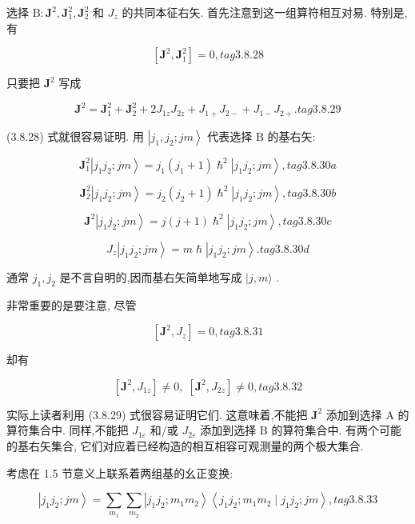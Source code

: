 选择 $\mathrm{B} : {\mathbf{J}}^{2},{\mathbf{J}}_{1}^{2},{\mathbf{J}}_{2}^{2}$ 和 ${J}_{z}$ 的共同本征右矢. 首先注意到这一组算符相互对易. 特别是, 有

$$
\left\lbrack {{\mathbf{J}}^{2},{\mathbf{J}}_{1}^{2}}\right\rbrack = 0, tag{3.8.28}
$$

只要把 ${\mathbf{J}}^{2}$ 写成

$$
{\mathbf{J}}^{2} = {\mathbf{J}}_{1}^{2} + {\mathbf{J}}_{2}^{2} + 2{J}_{1z}{J}_{2z} + {J}_{1 + }{J}_{2 - } + {J}_{1 - }{J}_{2 + }. tag{3.8.29}
$$

(3.8.28) 式就很容易证明. 用 $\left| {{j}_{1},{j}_{2};{jm}}\right\rangle$ 代表选择 $\mathrm{B}$ 的基右矢:

$$
{\mathbf{J}}_{1}^{2}\left| {{j}_{1}{j}_{2};{jm}}\right\rangle = {j}_{1}\left( {{j}_{1} + 1}\right) {\hslash }^{2}\left| {{j}_{1}{j}_{2};{jm}}\right\rangle , tag{3.8.30a}
$$

$$
{\mathbf{J}}_{2}^{2}\left| {{j}_{1}{j}_{2};{jm}}\right\rangle = {j}_{2}\left( {{j}_{2} + 1}\right) {\hslash }^{2}\left| {{j}_{1}{j}_{2};{jm}}\right\rangle , tag{3. 8. 30b}
$$

$$
{\mathbf{J}}^{2}\left| {{j}_{1}{j}_{2};{jm}}\right\rangle = j\left( {j + 1}\right) {\hslash }^{2}\left| {{j}_{1}{j}_{2};{jm}}\right\rangle , tag{3.8.30c}
$$

$$
{J}_{z}\left| {{j}_{1}{j}_{2};{jm}}\right\rangle = m\hslash \left| {{j}_{1}{j}_{2};{jm}}\right\rangle . tag{3.8.30d}
$$

通常 ${j}_{1},{j}_{2}$ 是不言自明的,因而基右矢简单地写成 $|j, m\rangle$ .

非常重要的是要注意, 尽管

$$
\left\lbrack {{\mathbf{J}}^{2},{J}_{z}}\right\rbrack = 0, tag{3.8.31}
$$

却有

$$
\left\lbrack {{\mathbf{J}}^{2},{J}_{1z}}\right\rbrack \neq 0,\;\left\lbrack {{\mathbf{J}}^{2},{J}_{2z}}\right\rbrack \neq 0, tag{3.8.32}
$$

实际上读者利用 (3.8.29) 式很容易证明它们. 这意味着,不能把 ${\mathbf{J}}^{2}$ 添加到选择 $\mathrm{A}$ 的算符集合中. 同样,不能把 ${J}_{1\varepsilon }$ 和/或 ${J}_{2\varepsilon }$ 添加到选择 $\mathrm{B}$ 的算符集合中. 有两个可能的基右矢集合, 它们对应着已经构造的相互相容可观测量的两个极大集合.

考虑在 1.5 节意义上联系着两组基的幺正变换:

$$
\left| {{j}_{1}{j}_{2};{jm}}\right\rangle = \mathop{\sum }\limits_{{m}_{1}}\mathop{\sum }\limits_{{m}_{2}}\left| {{j}_{1}{j}_{2};{m}_{1}{m}_{2}}\right\rangle \left\langle {{j}_{1}{j}_{2};{m}_{1}{m}_{2} \mid {j}_{1}{j}_{2};{jm}}\right\rangle , tag{3.8.33}
$$

